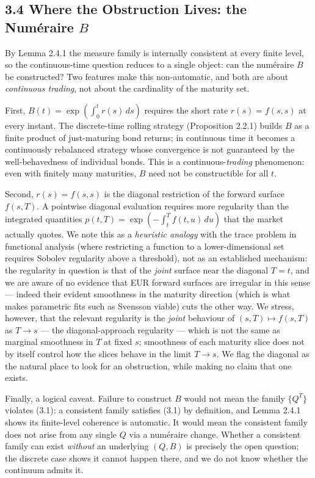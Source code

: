 \documentclass[
]{article}
\begin{document}
\subsection{\texorpdfstring{3.4 Where the Obstruction Lives: the
Numéraire
\(B\)}{3.4 Where the Obstruction Lives: the Numéraire B}}\label{where-the-obstruction-lives-the-numuxe9raire-b}

By Lemma 2.4.1 the measure family is internally consistent at every
finite level, so the continuous-time question reduces to a single
object: can the numéraire \(B\) be constructed? Two features make this
non-automatic, and both are about \emph{continuous trading}, not about
the cardinality of the maturity set.

First, \(B(t) = \exp\left(\int_0^t r(s)\, ds\right)\) requires the short
rate \(r(s) = f(s,s)\) at every instant. The discrete-time rolling
strategy (Proposition 2.2.1) builds \(B\) as a finite product of
just-maturing bond returns; in continuous time it becomes a continuously
rebalanced strategy whose convergence is not guaranteed by the
well-behavedness of individual bonds. This is a
continuous-\emph{trading} phenomenon: even with finitely many
maturities, \(B\) need not be constructible for all \(t\).

Second, \(r(s) = f(s,s)\) is the diagonal restriction of the forward
surface \(f(s,T)\). A pointwise diagonal evaluation requires more
regularity than the integrated quantities
\(p(t,T) = \exp(-\int_t^T f(t,u)\,du)\) that the market actually quotes.
We note this as a \emph{heuristic analogy} with the trace problem in
functional analysis (where restricting a function to a lower-dimensional
set requires Sobolev regularity above a threshold), not as an
established mechanism: the regularity in question is that of the
\emph{joint} surface near the diagonal \(T = t\), and we are aware of no
evidence that EUR forward surfaces are irregular in this sense ---
indeed their evident smoothness in the maturity direction (which is what
makes parametric fits such as Svensson viable) cuts the other way. We
stress, however, that the relevant regularity is the \emph{joint}
behaviour of \((s,T) \mapsto f(s,T)\) as \(T \to s\) --- the
diagonal-approach regularity --- which is not the same as marginal
smoothness in \(T\) at fixed \(s\); smoothness of each maturity slice
does not by itself control how the slices behave in the limit
\(T \to s\). We flag the diagonal as the natural place to look for an
obstruction, while making no claim that one exists.

Finally, a logical caveat. Failure to construct \(B\) would not mean the
family \(\{Q^T\}\) violates (3.1): a consistent family satisfies (3.1)
by definition, and Lemma 2.4.1 shows its finite-level coherence is
automatic. It would mean the consistent family does not arise from any
single \(Q\) via a numéraire change. Whether a consistent family can
exist \emph{without} an underlying \((Q, B)\) is precisely the open
question; the discrete case shows it cannot happen there, and we do not
know whether the continuum admits it.
\end{document}
